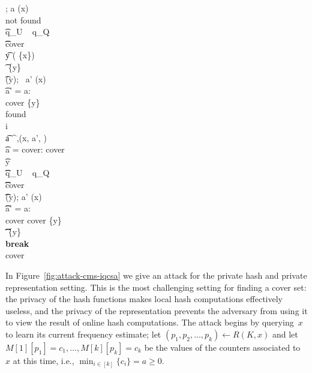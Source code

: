 \begin{figure*}[ht!]
\begin{pchstack}[boxed,center,space=0.5em]
{				 \gets \emptyset; a \gets \QRYO(x) \\
				\hspace{-.5em}
				\pcwhile \textrm{not found} \\
				\t \pcif q_U \ \UPO {} q_Q \ \QRYO{}\\
				\t \t \pcreturn \textrm{cover} \\
				\t y \getsr \univ \setminus ( \cup \{x\})\\
				\t \streamvar{I} \gets {} \cup \{y\}\\
				\t \UPO(y); \ a' \gets \QRYO(x)\\
				\t \pcif a' \not= a: \\
				\t \t \textrm{cover} \gets \{y\}\\
				\t \t \textrm{found} \gets {}\\
				\pcfor i \in [2, 3, \dots, k]\label{alg:CMS:CK:change}\\
				\t a \gets {}^{\UPO,\QRYO}(x, a', ) \\
				\t \pcif a = \textrm{cover}: \pcreturn \textrm{cover}\\
				\t \pcfor y \in {} \ \\
				\t \t \pcif q_U \ \UPO {} q_Q \ \QRYO{}\\
				\t \t \t \pcreturn \textrm{cover}\\
				\t \t \UPO(y); a' \gets \QRYO(x) \\
				\t \t \pcif a' \not= a: \\
				\t \t \t \textrm{cover} \gets \textrm{cover} \cup \{y\}\\
				\t \t \t {} \gets {} \setminus \{y\}\\
				\t \t \t \textbf{break}\\
				\pcreturn \textrm{cover}
			}
		\end{pchstack}
	\caption{Cover Set Attack for the CMS in private
		hash function and private representation setting. 
		The attack is parametrised with  the update and query query budget $q_U$ and $q_Q$.
	}
	\label{fig:attack-cms-iqcsa}
\end{figure*}


In Figure~\ref{fig:attack-cms-iqcsa} we give an attack for the private hash and private representation setting.  This is the most challenging setting for finding a cover set: the privacy of the hash functions makes local hash computations effectively useless, and the privacy of the representation prevents the adversary from using it to view the result of online hash computations.  The attack begins by querying~$x$ to learn its current frequency estimate; let $(p_1,p_2,\ldots,p_k) \gets R(K,x)$ and let $M[1][p_1]=c_1,\ldots,M[k][p_k]=c_k$ be the values of the counters associated to~$x$ at this time, i.e., $\min_{i\in[k]}\{c_i\}=a \geq 0$. 

